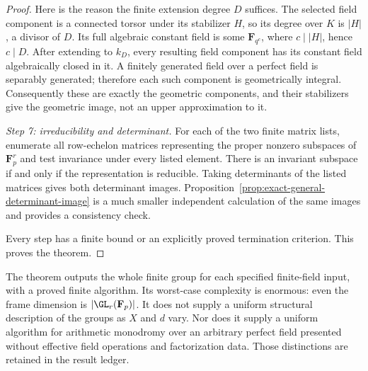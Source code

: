 \begin{proof}
Here is the reason the finite extension degree $D$
suffices.  The selected field component is a connected
torsor under its stabilizer $H$, so its degree over
$K$ is $|H|$, a divisor of $D$.  Its full algebraic
constant field is some $\mathbf F_{q^c}$, where
$c\mid |H|$, hence $c\mid D$.
After extending to $k_D$, every resulting field
component has its constant field algebraically closed
in it.  A finitely generated field over a perfect
field is separably generated; therefore each such
component is geometrically integral.
Consequently these are exactly the geometric
components, and their stabilizers give the geometric
image, not an upper approximation to it.

\emph{Step 7: irreducibility and determinant.}
For each of the two finite matrix lists, enumerate
all row-echelon matrices representing the proper
nonzero subspaces of $\mathbf F_p^r$ and test
invariance under every listed element.
There is an invariant subspace if and only if the
representation is reducible.  Taking determinants
of the listed matrices gives both determinant
images.  Proposition~\ref{prop:exact-general-determinant-image}
is a much smaller independent calculation of the
same images and provides a consistency check.

Every step has a finite bound or an explicitly proved
termination criterion.  This proves the theorem.
\end{proof}

\begin{remark}\label{rem:effective-monodromy-scope}
The theorem outputs the whole finite group for each
specified finite-field input, with a proved finite
algorithm.  Its worst-case complexity is enormous:
even the frame dimension is $|\GL_r(\mathbf F_p)|$.
It does not supply a uniform structural description
of the groups as $X$ and $d$ vary.  Nor does it supply
a uniform algorithm for arithmetic monodromy over
an arbitrary perfect field presented without effective
field operations and factorization data.
Those distinctions are retained in the result ledger.
\end{remark}

